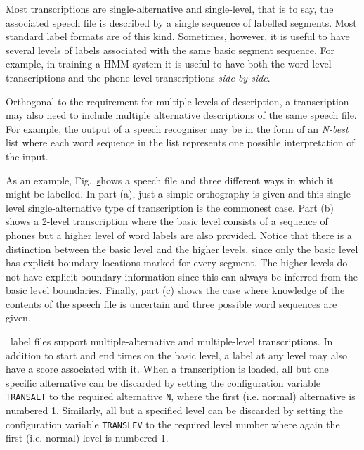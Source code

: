 
Most transcriptions are single-alternative and single-level, that is
to say, the associated speech file is described by a single sequence
of labelled segments.  Most standard label formats are of this kind.
Sometimes, however, it is useful to have several levels of labels associated
with the same basic segment sequence.   For example, in training a HMM
system it is useful to have both the word level transcriptions and the
phone level transcriptions \textit{side-by-side}.  

Orthogonal to the requirement for multiple levels of description,
a transcription may also need to include multiple alternative
descriptions of the same speech file.  For example, the output
of a speech recogniser may be in the form of an \textit{N-best} list
where each word sequence in the list represents one possible interpretation
of the input.

As an example, Fig.~\href{f:labegs} shows a speech file and three
different ways in which it might be labelled.  In part (a), just a simple
orthography is given and this single-level single-alternative type of
transcription is the  commonest case. Part (b) shows a 2-level
transcription  where the basic level consists of a sequence of phones but
a higher level of word labels are also provided.  Notice that there is a
distinction between the basic level and the higher levels, since only the
basic level has explicit boundary locations marked for every segment. 
The higher levels do not have explicit boundary information since this
can always be inferred from the basic level boundaries. Finally, part (c)
shows the case where knowledge of the contents of the speech file is
uncertain and three possible word sequences are given.

\HTK\ label files support multiple-alternative and multiple-level
transcriptions.  In addition to start and end times on the basic level, a
label at  any level may also have a score associated with it.  When a
transcription is loaded, all but one specific alternative can be discarded by
setting the configuration variable \texttt{TRANSALT} to the required
alternative \texttt{N}, where the first (i.e. normal) alternative is numbered
1.  Similarly, all but a specified level can be discarded by setting the
configuration variable 
\texttt{TRANSLEV} to 
the required level number where again the first (i.e.
normal) level is numbered 1.

